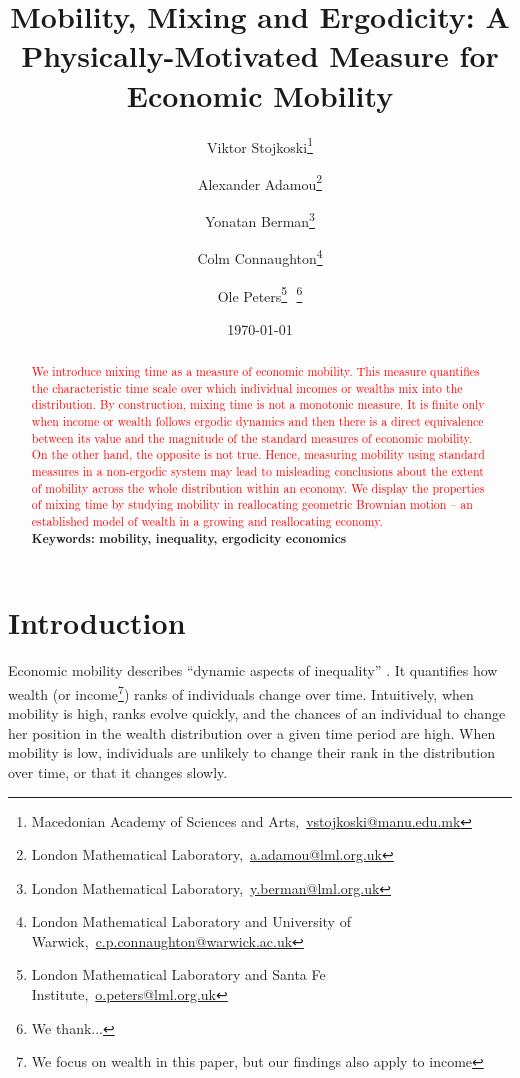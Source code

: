 \documentclass[11pt]{article}
\newcommand{\bc}{\begin{center}}
\newcommand{\ec}{\end{center}}
\newcommand{\red}[1]{{\color{red} #1}}
\numberwithin{equation}{section}
\begin{document}
\begin{titlepage}
\title{Mobility, Mixing and Ergodicity: A Physically-Motivated Measure for Economic Mobility}
\author{Viktor Stojkoski\footnote{Macedonian Academy of Sciences and Arts,~\url{vstojkoski@manu.edu.mk}} \and Alexander Adamou\footnote{London Mathematical Laboratory,~\url{a.adamou@lml.org.uk}} \and Yonatan Berman\footnote{London Mathematical Laboratory,~\url{y.berman@lml.org.uk}} \and Colm Connaughton\footnote{London Mathematical Laboratory and University of Warwick,~\url{c.p.connaughton@warwick.ac.uk}} \and Ole Peters\footnote{London Mathematical Laboratory and Santa Fe Institute,~\url{o.peters@lml.org.uk}}\,\, \thanks{We thank...}}
\date{\today}
\maketitle
\begin{abstract}
\noindent \textcolor{red}{We introduce mixing time as a measure of economic mobility. This measure quantifies the characteristic time scale over which individual incomes or wealths mix into the distribution. By construction, mixing time is not a monotonic measure. It is finite only when income or wealth follows ergodic dynamics and then there is a direct equivalence between its value and the magnitude of the standard measures of economic mobility. On the other hand, the opposite is not true. Hence, measuring mobility using standard measures in a non-ergodic system may lead to misleading conclusions about the extent of mobility across the whole distribution within an economy. We display the properties of mixing time by studying mobility in reallocating geometric Brownian motion -- an established model of wealth in a growing and reallocating economy.}
\\

\noindent\textbf{Keywords: mobility, inequality, ergodicity economics}
\end{abstract}
\setcounter{page}{0}
\thispagestyle{empty}
\end{titlepage}
\pagebreak \newpage
\section{Introduction}\label{sec:introduction}
Economic mobility describes ``dynamic aspects of inequality'' \citep{Shorrocks1978}. It quantifies how wealth (or income\footnote{We focus on wealth in this paper, but our findings also apply to income}) ranks of individuals change over time. Intuitively, when mobility is high, ranks evolve quickly, and the chances of an individual to change her position in the wealth distribution over a given time period are high. When mobility is low, individuals are unlikely to change their rank in the distribution over time, or that it changes slowly.
\end{document}
